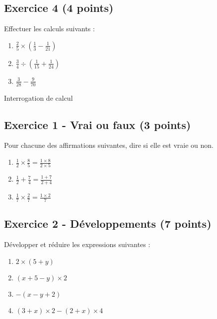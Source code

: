\documentclass[14 pt]{extarticle}
\theoremstyle{plain}
\begin{document}
\subsection*{Exercice 4 (4 points)}

Effectuer les calculs suivants : 

\begin{enumerate}
\item $\frac25 \times (\frac13-\frac1{21})$
\item $\frac34 \div (\frac1{15}+\frac1{24})$
\item $\frac3{28} - \frac{9}{70}$ 
\end{enumerate}

\newpage  

\begin{center}{\Large Interrogation de calcul}\\ 
 \end{center}




\subsection*{Exercice 1 - Vrai ou faux (3 points)}

Pour chacune des affirmations suivantes, dire si elle est vraie ou non. 

\begin{enumerate}
\item $\frac{1}{2} \times \frac{8}{5} = \frac{1\times8}{2\times5}$
\item $\frac{1}{2} + \frac{7}{4} = \frac{1+7}{2+4}$

\item $\frac{1}{7} \times\frac{2}{7} = \frac{1\times 2}{7}$

\end{enumerate}

\subsection*{Exercice 2 - Développements (7 points)}

Développer et réduire les expressions suivantes : 

\begin{enumerate}
\item $2\times (5 + y) $
\item $(x + 5  - y) \times 2$
\item $-(x - y + 2)$
\item $(3 + x) \times 2 - (2+ x) \times 4$

\end{enumerate}
\end{document}
